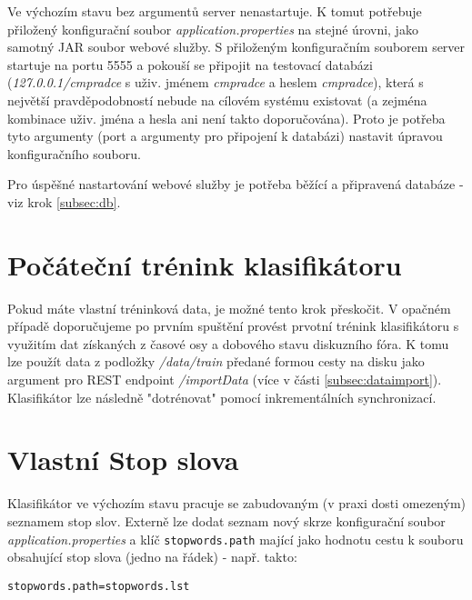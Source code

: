 \documentclass{article}
\begin{document}
Ve výchozím stavu bez argumentů server nenastartuje. K tomut potřebuje přiložený konfigurační soubor \textit{application.properties} na stejné úrovni, jako samotný JAR soubor webové služby. S přiloženým konfiguračním souborem server startuje na portu 5555 a pokouší se připojit na testovací databázi (\textit{127.0.0.1/cmpradce} s uživ. jménem \textit{cmpradce} a heslem \textit{cmpradce}), která s největší pravděpodobností nebude na cílovém systému existovat (a zejména kombinace uživ. jména a hesla ani není takto doporučována). Proto je potřeba tyto argumenty (port a argumenty pro připojení k databázi) nastavit úpravou konfiguračního souboru.

Pro úspěšné nastartování webové služby je potřeba běžící a připravená databáze - viz krok \ref{subsec:db}.

\section{Počáteční trénink klasifikátoru}

Pokud máte vlastní tréninková data, je možné tento krok přeskočit. V opačném případě doporučujeme po prvním spuštění provést prvotní trénink klasifikátoru s využitím dat získaných z časové osy a dobového stavu diskuzního fóra. K tomu lze použít data z podložky \textit{/data/train} předané formou cesty na disku jako argument pro REST endpoint \textit{/importData} (více v části \ref{subsec:dataimport}). Klasifikátor lze následně "dotrénovat" pomocí inkrementálních synchronizací.


\section{Vlastní Stop slova}

Klasifikátor ve výchozím stavu pracuje se zabudovaným (v praxi dosti omezeným) seznamem stop slov. Externě lze dodat seznam nový skrze konfigurační soubor \textit{application.properties} a klíč \texttt{stopwords.path} mající jako hodnotu cestu k souboru obsahující stop slova (jedno na řádek) - např. takto:

\begin{verbatim}
stopwords.path=stopwords.lst
\end{verbatim}
\end{document}
